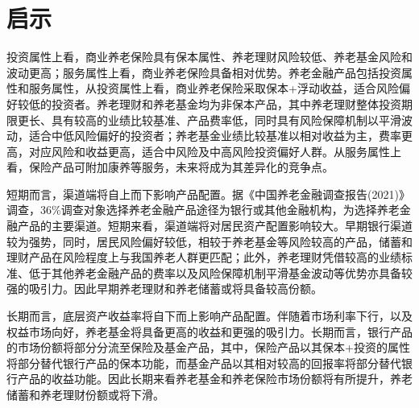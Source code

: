 \documentclass[a4paper,10.5pt]{ctexart}
\begin{document}
\section{启示}
投资属性上看，商业养老保险具有保本属性、养老理财风险较低、养老基金风险和波动更高；服务属性上看，商业养老保险具备相对优势。养老金融产品包括投资属性和服务属性，从投资属性上看，商业养老保险采取保本+浮动收益，适合风险偏好较低的投资者。养老理财和养老基金均为非保本产品，其中养老理财整体投资期限更长、具有较高的业绩比较基准、产品费率低，同时具有风险保障机制以平滑波动，适合中低风险偏好的投资者；养老基金业绩比较基准以相对收益为主，费率更高，对应风险和收益更高，适合中风险及中高风险投资偏好人群。从服务属性上看，保险产品可附加康养等服务，未来将成为其差异化的竞争点。

短期而言，渠道端将自上而下影响产品配置。据《中国养老金融调查报告(2021)》调查，36\%调查对象选择养老金融产品途径为银行或其他金融机构，为选择养老金融产品的主要渠道。短期来看，渠道端将对居民资产配置影响较大。早期银行渠道较为强势，同时，居民风险偏好较低，相较于养老基金等风险较高的产品，储蓄和理财产品在风险程度上与我国养老人群更匹配；此外，养老理财凭借较高的业绩标准、低于其他养老金融产品的费率以及风险保障机制平滑基金波动等优势亦具备较强的吸引力。因此早期养老理财和养老储蓄或将具备较高份额。

长期而言，底层资产收益率将自下而上影响产品配置。伴随着市场利率下行，以及权益市场向好，养老基金将具备更高的收益和更强的吸引力。长期而言，银行产品的市场份额将部分分流至保险及基金产品，其中，保险产品以其保本+投资的属性将部分替代银行产品的保本功能，而基金产品以其相对较高的回报率将部分替代银行产品的收益功能。因此长期来看养老基金和养老保险市场份额将有所提升，养老储蓄和养老理财份额或将下滑。

\appendix
\nocite{*}
\printbibliography[heading=bibliography]
\end{document}
